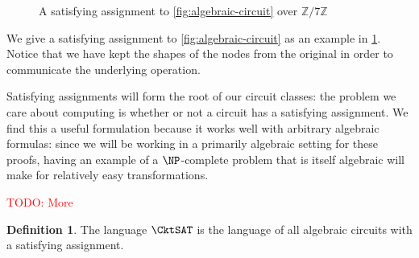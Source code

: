 \documentclass[english,12pt]{reedthesis}
\theoremstyle{plain}
\theoremstyle{definition}
\newtheorem{defn}[defn]{Definition}
\theoremstyle{remark}
\newcommand{\TODO}[1]{\textcolor{red}{TODO: #1}}
\begin{document}
\begin{figure}
  \begin{center}
  \end{center}
  \caption{A satisfying assignment to \cref{fig:algebraic-circuit} over $\mathbb{Z}/7\mathbb{Z}$}\label{fig:sat-assignment}
\end{figure}

We give a satisfying assignment to \cref{fig:algebraic-circuit} as an example in
\cref{fig:sat-assignment}. Notice that we have kept the shapes of the nodes from
the original in order to communicate the underlying operation.

Satisfying assignments will form the root of our circuit classes: the problem we
care about computing is whether or not a circuit has a satisfying assignment.
We find this a useful formulation because it works well with arbitrary algebraic
formulas: since we will be working in a primarily algebraic setting for these
proofs, having an example of a $\NP$-complete problem that is itself algebraic
will make for relatively easy transformations.

\TODO{More}

\begin{defn}\label{def:cktsat}
  The language $\CktSAT$ is the language of all algebraic circuits with a
  satisfying assignment.
\end{defn}
\end{document}
